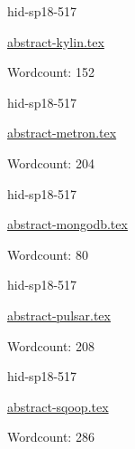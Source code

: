 

\begin{IU}

hid-sp18-517

\href{https://github.com/cloudmesh-community/hid-sp18-517/blob/master//technology/abstract-kylin.tex}{abstract-kylin.tex}

 

Wordcount: 152

\end{IU}



\begin{IU}

hid-sp18-517

\href{https://github.com/cloudmesh-community/hid-sp18-517/blob/master//technology/abstract-metron.tex}{abstract-metron.tex}

 

Wordcount: 204

\end{IU}



\begin{IU}

hid-sp18-517

\href{https://github.com/cloudmesh-community/hid-sp18-517/blob/master//technology/abstract-mongodb.tex}{abstract-mongodb.tex}

 

Wordcount: 80

\end{IU}



\begin{IU}

hid-sp18-517

\href{https://github.com/cloudmesh-community/hid-sp18-517/blob/master//technology/abstract-pulsar.tex}{abstract-pulsar.tex}

 

Wordcount: 208

\end{IU}



\begin{IU}

hid-sp18-517

\href{https://github.com/cloudmesh-community/hid-sp18-517/blob/master//technology/abstract-sqoop.tex}{abstract-sqoop.tex}

 

Wordcount: 286

\end{IU}


